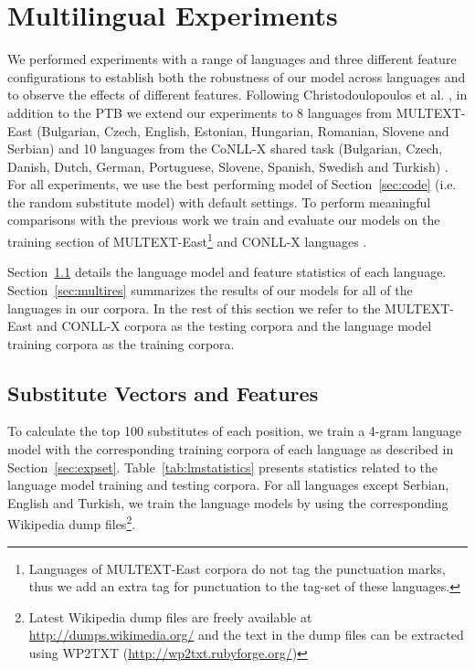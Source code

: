 \section{Multilingual Experiments}
\label{sec:multilang}
\noindent We performed experiments with a range of languages and three
different feature configurations to establish both the robustness of
our model across languages and to observe the effects of different
features.  Following Christodoulopoulos et
al. , in
addition to the PTB we extend our experiments to 8 languages from
MULTEXT-East (Bulgarian, Czech, English, Estonian, Hungarian,
Romanian, Slovene and Serbian) \cite{citeulike:5820223} and 10
languages from the CoNLL-X shared task (Bulgarian, Czech, Danish,
Dutch, German, Portuguese, Slovene, Spanish, Swedish and Turkish)
\cite{Buchholz:2006:CST:1596276.1596305}.  For all experiments, we use
the best performing model of Section~\ref{sec:code} (i.e. the random
substitute model) with default settings.  To perform meaningful
comparisons with the previous work we train and evaluate our models on
the training section of MULTEXT-East\footnote{Languages of
  MULTEXT-East corpora do not tag the punctuation marks, thus we add
  an extra tag for punctuation to the tag-set of these languages.} and
CONLL-X languages \cite{Lee:2010:STU:1870658.1870741}.

Section~\ref{sec:multivecfeat} details the language model and feature
statistics of each language.  Section~\ref{sec:multires} summarizes
the results of our models for all of the languages in our corpora.  In
the rest of this section we refer to the MULTEXT-East and CONLL-X
corpora as the testing corpora and the language model training corpora
as the training corpora.

\subsection{Substitute Vectors and Features}
\label{sec:multivecfeat}
 
To calculate the top 100 substitutes of each position, we train a
4-gram language model with the corresponding training corpora of each
language as described in Section~\ref{sec:expset}.
Table~\ref{tab:lmstatistics} presents statistics related to the
language model training and testing corpora.  For all languages
except Serbian, English and Turkish, we train the language models by
using the corresponding Wikipedia dump files\footnote{Latest Wikipedia
  dump files are freely available at \url{http://dumps.wikimedia.org/}
  and the text in the dump files can be extracted using WP2TXT
  (\url{http://wp2txt.rubyforge.org/})}.

